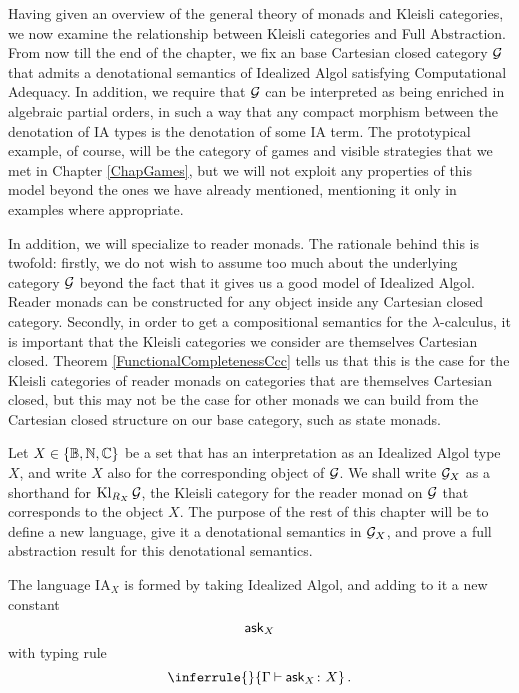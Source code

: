 Having given an overview of the general theory of monads and Kleisli categories, we now examine the relationship between Kleisli categories and Full Abstraction.  From now till the end of the chapter, we fix an base Cartesian closed category $\mathcal G$ that admits a denotational semantics of Idealized Algol satisfying Computational Adequacy.  
In addition, we require that $\mathcal G$ can be interpreted as being enriched in algebraic partial orders, in such a way that any compact morphism between the denotation of IA types is the denotation of some IA term.
The prototypical example, of course, will be the category of games and visible strategies that we met in Chapter \ref{ChapGames}, but we will not exploit any properties of this model beyond the ones we have already mentioned, mentioning it only in examples where appropriate.

In addition, we will specialize to reader monads.  
The rationale behind this is twofold: firstly, we do not wish to assume too much about the underlying category $\mathcal G$ beyond the fact that it gives us a good model of Idealized Algol.  
Reader monads can be constructed for any object inside any Cartesian closed category.
Secondly, in order to get a compositional semantics for the $\lambda$-calculus, it is important that the Kleisli categories we consider are themselves Cartesian closed.  
Theorem \ref{FunctionalCompletenessCcc} tells us that this is the case for the Kleisli categories of reader monads on categories that are themselves Cartesian closed, but this may not be the case for other monads we can build from the Cartesian closed structure on our base category, such as state monads.

Let $X\in \{\mathbb{B},\mathbb{N},\mathbb{C}\}$ be a set that has an interpretation as an Idealized Algol type $X$, and write $X$ also for the corresponding object of $\mathcal G$.
We shall write $\mathcal G_X$ as a shorthand for $\operatorname{Kl}_{R_X}\mathcal G$, the Kleisli category for the reader monad on $\mathcal G$ that corresponds to the object $X$.  
The purpose of the rest of this chapter will be to define a new language, give it a denotational semantics in $\mathcal G_X$, and prove a full abstraction result for this denotational semantics.

\newcommand{\IAX}{{IA${}_X$}\xspace}
\begin{definition}[{The language \IAX}]
  The language \IAX is formed by taking Idealized Algol, and adding to it a new constant
  \[
    \operatorname{{\mathsf{ask}}}_X
    \]
  with typing rule
  \[
    \inferrule{ }{\Gamma \ts \ask_X \from X}\,.
    \]
\end{definition}

